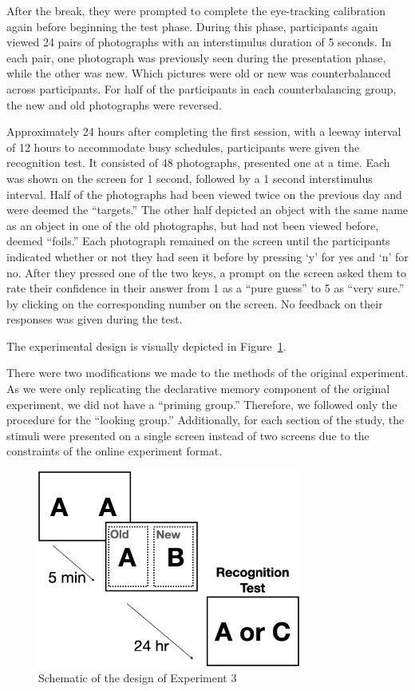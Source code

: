 \documentclass[
  man,floatsintext]{apa6}
\begin{document}
After the break, they were prompted to complete the eye-tracking
calibration again before beginning the test phase. During this phase,
participants again viewed 24 pairs of photographs with an interstimulus
duration of 5 seconds. In each pair, one photograph was previously seen
during the presentation phase, while the other was new. Which pictures
were old or new was counterbalanced across participants.
For half of the participants in each counterbalancing group, the new and
old photographs were
reversed.

Approximately 24 hours after completing the first session, with a leeway
interval of 12 hours to accommodate busy schedules, participants were
given the recognition test. It consisted of 48 photographs, presented
one at a time. Each was shown on the screen for 1 second, followed by a
1 second interstimulus interval. Half of the photographs had been
viewed twice on the previous day and were deemed the ``targets.'' The
other half depicted an object with the same name as an object in one of
the old photographs, but had not been viewed before, deemed ``foils.''
Each photograph remained on the screen until the participants indicated
whether or not they had seen it before by pressing `y' for yes and `n'
for no. After they pressed one of the two keys, a prompt on the screen
asked them to rate their confidence in their answer from 1 as a ``pure
guess'' to 5 as ``very sure.'' by clicking on the corresponding number on
the screen. No feedback on their responses was given during the test.

The experimental design is visually depicted in Figure~\ref{fig:E3-design-schematic}.

There were two modifications we made to the methods of the original
experiment. As we were only replicating the declarative memory component
of the original experiment, we did not have a ``priming group.''
Therefore, we followed only the procedure for the ``looking group.''
Additionally, for each section of the study, the stimuli were presented
on a single screen instead of two screens due to the constraints of the
online experiment format.

\begin{figure}
\includegraphics[width=3.41in]{group-c/E3-example-figure} \caption{Schematic of the design of Experiment 3}\label{fig:E3-design-schematic}
\end{figure}
\end{document}
